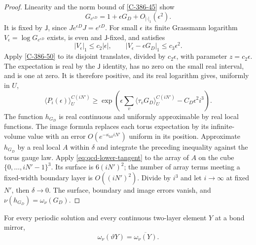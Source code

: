 \documentclass[11pt,letterpaper,reqno]{amsart}
\makeatletter
\theoremstyle{definition}
\newcommand{\ms@majorstart}{%
  \pushQED{\qed}\renewcommand{\qedsymbol}{$\blacksquare\square$}}
\newenvironment{theorem}[1][]{\ms@majorstart\ms@theorem[#1]}
  {\popQED\endms@theorem}
\theoremstyle{remark}
\makeatother
\begin{document}
\begin{proof}
Linearity and the norm bound of \cref{C-386-45} show
\[
 G_{e^{\epsilon D}}=1+\epsilon G_D+O_{|\cdot|_1}(\epsilon^2).
\]
It is fixed by $\mathsf J$, since $Je^{\epsilon D}J=e^{\epsilon D}$.
For small $\epsilon$ its finite Grassmann logarithm
$V_\epsilon=\log G_{e^{\epsilon D}}$ exists,
is even and $\mathsf J$-fixed, and satisfies
\[
 |V_\epsilon|_1\le c_2|\epsilon|,\qquad
 |V_\epsilon-\epsilon G_D|_1\le c_3\epsilon^2.
\]
Apply \cref{C-386-50} to its disjoint translates, divided by
$c_2\epsilon$, with parameter $z=c_2\epsilon$.
The expectation is real by the $\mathsf J$ identity, has no
zero on the small real interval, and is one at zero. It is
therefore positive, and its real logarithm gives, uniformly in $U$,
\[
 \langle P_i(\epsilon)\rangle_U^{C(iN')}
 \ge\exp\left(\epsilon\sum_v
                  \langle\tau_vG_D\rangle_U^{C(iN')}
                                     -C_D\epsilon^2i^3\right).
\]
The function $h_{G_D}$ is real continuous and uniformly
approximable by real local functions. The image formula replaces
each torus expectation by its infinite-volume value with an error
$O(e^{-\kappa_{\mathrm{lat}} iN'})$ uniform in its position. Approximate
$h_{G_D}$ by a real local $A$ within $\delta$ and integrate
the preceding inequality against the torus gauge law.
Apply \eqref{eq:qcd-lower-tangent} to the array of $A$ on the
cube $\{0,\ldots,iN'-1\}^3$. Its surface is $6(iN')^2$;
the number of array terms meeting a fixed-width boundary layer
is $O((iN')^2)$. Divide by $i^3$ and let $i\to\infty$ at
fixed $N'$, then $\delta\to0$. The surface, boundary and image
errors vanish, and $\nu(h_{G_D})=\omega_\nu(G_D)$.
\end{proof}

\begin{theorem}[The two-layer principle]\label{C-386-54}
For every periodic solution and every continuous two-layer
element $Y$ at a bond mirror,
\[
                         \omega_\nu(\vartheta Y)=\overline{\omega_\nu(Y)}.
\]
\end{theorem}
\end{document}

